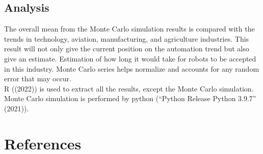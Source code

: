 \documentclass[
  man]{apa7}
\begin{document}
\hypertarget{analysis}{%
\subsection{Analysis}\label{analysis}}

The overall mean from the Monte Carlo simulation results is compared with the trends in technology, aviation, manufacturing, and agriculture industries. This result will not only give the current position on the automation trend but also give an estimate. Estimation of how long it would take for robots to be accepted in this industry. Monte Carlo series helps normalize and accounts for any random error that may occur.\\
R ((2022)) is used to extract all the results, except the Monte Carlo simulation. Monte Carlo simulation is performed by python ({``Python Release Python 3.9.7''} (2021)).

\newpage

\hypertarget{references}{%
\section{References}\label{references}}

\begingroup
\setlength{\parindent}{-0.5in}
\setlength{\leftskip}{0.5in}
\end{document}
